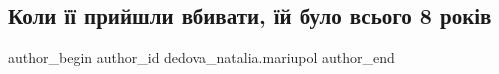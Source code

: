  
 
 
 
 

\subsection{Коли її прийшли вбивати, їй було всього 8 років}
\label{sec:29_01_2023.fb.dedova_natalia.mariupol.1.koli___priishli_vbi}

\ifcmt
 author_begin
   author_id dedova_natalia.mariupol
 author_end
\fi
